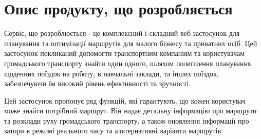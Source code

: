 \section{Опис продукту, що розробляється}
\label{sec:product-description}


Сервіс, що розроблюється - це комплексний і складний веб-застосунок для планування та оптимізації маршрутів для малого бізнесу та приватних осіб. Цей застосунок покликаний допомогти транспортним компаніям та користувачам громадського транспорту знайти один одного, шляхом полегшення планування щоденних поїздок на роботу, в навчальні заклади, та інших поїздок, забезпечуючи їм високий рівень ефективності та зручності. 

Цей застосунок пропонує ряд функцій, які гарантують, що кожен користувач може знайти потрібний маршрут. Він надає детальну інформацію про маршрути та розклади руху громадського транспорту, а також оновлення інформації про затори в режимі реального часу та альтернативні варіанти маршрутів.

